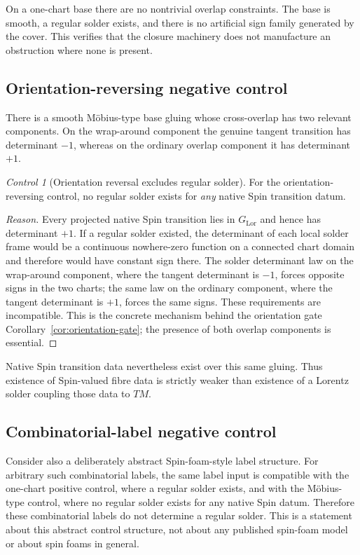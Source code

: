 \documentclass[11pt,a4paper]{article}
\theoremstyle{definition}
\theoremstyle{remark}
\newtheorem{control}[theorem]{Control}
\newcommand{\LorG}{G_{\mathrm{Lor}}}
\begin{document}
On a one-chart base there are no nontrivial overlap constraints.  The base
is smooth, a regular solder exists, and there is no artificial sign family
generated by the cover.  This verifies that the closure machinery does not
manufacture an obstruction where none is present.

\subsection{Orientation-reversing negative control}

There is a smooth M\"obius-type base gluing whose cross-overlap has two
relevant components.  On the wrap-around component the genuine tangent
transition has determinant \(-1\), whereas on the ordinary overlap component
it has determinant \(+1\).

\begin{control}[Orientation reversal excludes regular solder]
\label{control:moebius}
For the orientation-reversing control, no regular solder exists for
\emph{any} native Spin transition datum.
\end{control}

\begin{proof}[Reason]
Every projected native Spin transition lies in \(\LorG\) and hence has
determinant \(+1\).  If a regular solder existed, the determinant of each
local solder frame would be a continuous nowhere-zero function on a
connected chart domain and therefore would have constant sign there.  The
solder determinant law on the wrap-around component, where the tangent
determinant is \(-1\), forces opposite signs in the two charts; the same law
on the ordinary component, where the tangent determinant is \(+1\), forces
the same signs.  These requirements are incompatible.  This is the concrete
mechanism behind the orientation gate Corollary~\ref{cor:orientation-gate}; the
presence of both overlap components is essential.
\end{proof}

Native Spin transition data nevertheless exist over this same gluing.
Thus existence of Spin-valued fibre data is strictly weaker than existence
of a Lorentz solder coupling those data to \(TM\).

\subsection{Combinatorial-label negative control}

Consider also a deliberately abstract Spin-foam-style label structure.  For arbitrary such combinatorial labels,
the same label input is compatible with the one-chart positive control,
where a regular solder exists, and with the M\"obius-type control, where no
regular solder exists for any native Spin datum.  Therefore these
combinatorial labels do not determine a regular solder.  This is a statement
about this abstract control structure, not about any published spin-foam
model or about spin foams in general.
\end{document}
